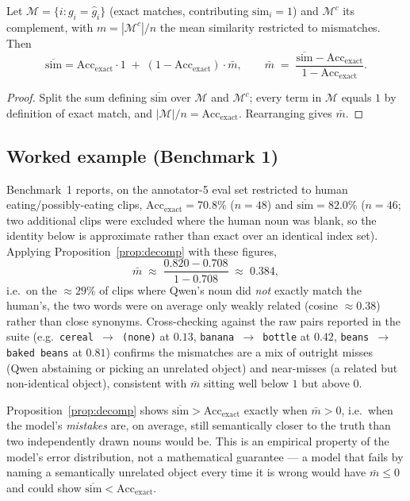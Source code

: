 \begin{proposition}
\label{prop:decomp}
Let $\mathcal{M} = \{i : g_i = \hat{g}_i\}$ (exact matches, contributing
$\mathrm{sim}_i = 1$) and $\mathcal{M}^c$ its complement, with
$m = |\mathcal{M}^c|/n$ the mean similarity restricted to mismatches. Then
\[
  \overline{\mathrm{sim}}
  = \mathrm{Acc}_{\mathrm{exact}} \cdot 1 \;+\; (1-\mathrm{Acc}_{\mathrm{exact}})\cdot \bar{m},
  \qquad
  \bar{m} \;=\; \frac{\overline{\mathrm{sim}} - \mathrm{Acc}_{\mathrm{exact}}}{1 - \mathrm{Acc}_{\mathrm{exact}}}.
\]
\end{proposition}
\begin{proof}
Split the sum defining $\overline{\mathrm{sim}}$ over $\mathcal{M}$ and
$\mathcal{M}^c$; every term in $\mathcal{M}$ equals $1$ by definition of
exact match, and $|\mathcal{M}|/n = \mathrm{Acc}_{\mathrm{exact}}$.
Rearranging gives $\bar m$.
\end{proof}

\subsection{Worked example (Benchmark 1)}

Benchmark~1 reports, on the annotator-5 eval set restricted to human
eating/possibly-eating clips, $\mathrm{Acc}_{\mathrm{exact}} = 70.8\%$
($n=48$) and $\overline{\mathrm{sim}} = 82.0\%$ ($n=46$; two additional
clips were excluded where the human noun was blank, so the identity below
is approximate rather than exact over an identical index set). Applying
Proposition~\ref{prop:decomp} with these figures,
\[
  \bar m \;\approx\; \frac{0.820 - 0.708}{1 - 0.708} \;\approx\; 0.384,
\]
i.e.\ on the $\approx 29\%$ of clips where Qwen's noun did \emph{not}
exactly match the human's, the two words were on average only weakly
related (cosine $\approx 0.38$) rather than close synonyms. Cross-checking
against the raw pairs reported in the suite (e.g.\ \texttt{cereal
$\to$ (none)} at $0.13$, \texttt{banana $\to$ bottle} at $0.42$,
\texttt{beans $\to$ baked beans} at $0.81$) confirms the mismatches are a
mix of outright misses (Qwen abstaining or picking an unrelated object)
and near-misses (a related but non-identical object), consistent with
$\bar m$ sitting well below $1$ but above $0$.

\begin{remark}
Proposition~\ref{prop:decomp} shows $\overline{\mathrm{sim}} >
\mathrm{Acc}_{\mathrm{exact}}$ exactly when $\bar m > 0$, i.e.\ when the
model's \emph{mistakes} are, on average, still semantically closer to the
truth than two independently drawn nouns would be. This is an empirical
property of the model's error distribution, not a mathematical
guarantee --- a model that fails by naming a semantically unrelated object
every time it is wrong would have $\bar m \le 0$ and could show
$\overline{\mathrm{sim}} < \mathrm{Acc}_{\mathrm{exact}}$.
\end{remark}
